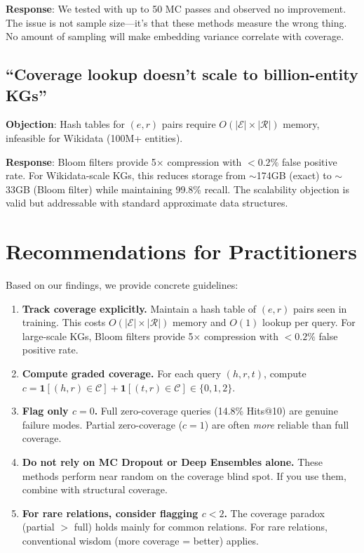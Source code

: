 \documentclass{article}
\begin{document}
\textbf{Response}: We tested with up to 50 MC passes and observed no improvement. The issue is not sample size---it's that these methods measure the wrong thing. No amount of sampling will make embedding variance correlate with coverage.

\subsection{``Coverage lookup doesn't scale to billion-entity KGs''}

\textbf{Objection}: Hash tables for $(e, r)$ pairs require $O(|\mathcal{E}| \times |\mathcal{R}|)$ memory, infeasible for Wikidata (100M+ entities).

\textbf{Response}: Bloom filters provide 5$\times$ compression with $<0.2\%$ false positive rate. For Wikidata-scale KGs, this reduces storage from $\sim$174GB (exact) to $\sim$33GB (Bloom filter) while maintaining 99.8\% recall. The scalability objection is valid but addressable with standard approximate data structures.

\section{Recommendations for Practitioners}
\label{sec:recommendations}

Based on our findings, we provide concrete guidelines:

\begin{enumerate}
    \item \textbf{Track coverage explicitly.} Maintain a hash table of $(e, r)$ pairs seen in training. This costs $O(|\mathcal{E}| \times |\mathcal{R}|)$ memory and $O(1)$ lookup per query. For large-scale KGs, Bloom filters provide 5$\times$ compression with $<0.2\%$ false positive rate.

    \item \textbf{Compute graded coverage.} For each query $(h, r, t)$, compute $c = \mathbf{1}[(h,r) \in \mathcal{C}] + \mathbf{1}[(t,r) \in \mathcal{C}] \in \{0, 1, 2\}$.

    \item \textbf{Flag only $c = 0$.} Full zero-coverage queries (14.8\% Hits@10) are genuine failure modes. Partial zero-coverage ($c = 1$) are often \emph{more} reliable than full coverage.

    \item \textbf{Do not rely on MC Dropout or Deep Ensembles alone.} These methods perform near random on the coverage blind spot. If you use them, combine with structural coverage.

    \item \textbf{For rare relations, consider flagging $c < 2$.} The coverage paradox (partial $>$ full) holds mainly for common relations. For rare relations, conventional wisdom (more coverage = better) applies.
\end{enumerate}
\end{document}
